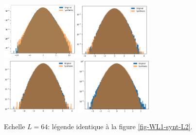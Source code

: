 \documentclass[12pt,twoside]{article}
\begin{document}
\begin{figure}
\centering
\includegraphics[width=0.35\textwidth]{fig-WL1-synt-L64-pixelval.png}\includegraphics[width=0.35\textwidth]{fig-WL1-synt-L64-details_1.png}\\
\includegraphics[width=0.35\textwidth]{fig-WL1-synt-L64-details_2.png}
\includegraphics[width=0.35\textwidth]{fig-WL1-synt-L64-details_3.png}
\caption{Echelle $L=64$: légende identique à la figure \ref{fig-WL1-synt-L2}.}
\label{fig-WL1-synt-L64}
\end{figure}
\end{document}
